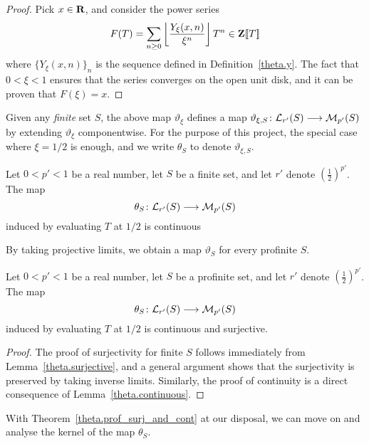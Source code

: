 \begin{proof}
  \leanok
  Pick $x\in \mathbf{R}$, and consider the power series
  \[
    F(T)=\sum_{n\geq 0}\left\lfloor \frac{Y_\xi(x,n)}{\xi^n}\right\rfloor T^n\in\mathbf{Z}[\![T]\!]
  \]
  where $\{Y_\xi(x,n)\}_{n}$ is the sequence defined in Definition~\ref{theta.y}. The fact that $0<\xi<1$ ensures that the series converges on the open unit disk, and it can be proven that $F(\xi)=x$.
\end{proof}

Given any \emph{finite} set $S$, the above map $\vartheta_{\xi}$ defines a map $\vartheta_{\xi,S}\colon \mathcal L_{r'}(S)\longrightarrow \mathcal M_{p'}(S)$ by extending $\vartheta_{\xi}$ componentwise. For the purpose of this project, the special case where $\xi=1/2$ is enough, and we write $\theta_S$ to denote $\vartheta_{\xi,S}$. 

\begin{lemma}
	\label{theta.continuous}
Let $0<p'<1$ be a real number, let $S$ be a finite set, and let $r'$ denote $\left(\frac{1}{2}\right)^{p'}$. The map
\[
\theta_{S}\colon \mathcal L_{r'}(S)\longrightarrow \mathcal M_{p'}(S)
\]
induced by evaluating $T$ at $1/2$ is continuous
\end{lemma}

By taking projective limits, we obtain a map $\vartheta_{S}$ for every profinite $S$.

\begin{theorem}
  \label{theta.prof_surj_and_cont}
Let $0<p'<1$ be a real number, let $S$ be a profinite set, and let $r'$ denote $\left(\frac{1}{2}\right)^{p'}$. The map
\[
\theta_{S}\colon \mathcal L_{r'}(S)\longrightarrow \mathcal M_{p'}(S)
\]
induced by evaluating $T$ at $1/2$ is continuous and surjective.
\end{theorem}
\begin{proof}
The proof of surjectivity for finite $S$ follows immediately from Lemma~\ref{theta.surjective}, and a general argument shows that the surjectivity is preserved by taking inverse limits. Similarly, the proof of continuity is a direct consequence of Lemma~\ref{theta.continuous}.
\end{proof}
With Theorem~\ref{theta.prof_surj_and_cont} at our disposal, we can move on and analyse the kernel of the map $\theta_{S}$.
